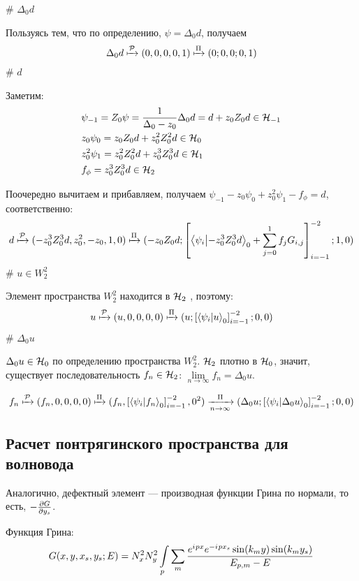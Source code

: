 \begin{elist}
# $\Delta_0 d$

Пользуясь тем, что по определению, $\psi = \Delta_0 d$, получаем
\[
\Delta_0 d \xmapsto[]{\mathcal{P}} (0, 0, 0, 0, 1) \xmapsto[]{\Pi} (0; 0, 0; 0, 1)
\]
# $d$

Заметим:
\begin{align*}
& \psi_{-1} = Z_0 \psi = \frac{1}{\Delta_0 - z_0} \Delta_0 d = d + z_0 Z_0 d \in \mathcal{H}_{-1} \\
& z_0 \psi_{0} = z_0 Z_0 d + z_0^2 Z_0^2 d \in \mathcal{H}_{0} \\
& z_0^2 \psi_{1} = z_0^2 Z_0^2 d + z_0^3 Z_0^3 d \in \mathcal{H}_{1} \\
& f_\phi = z_0^3 Z_0^3 d \in \mathcal{H}_{2}
\end{align*}

Поочередно вычитаем и прибавляем, получаем  $\psi_{-1} - z_0 \psi_0 + z_0^2 \psi_1 - f_\phi =  d$, соответственно:
\[
d \xmapsto[]{\mcP} (-z_0^3 Z_0^3 d, z_0^2, -z_0, 1, 0) \xmapsto[]{\Pi} (-z_0 Z_0 d; \left[ \ip{\psi_i}{-z_0^3 Z_0^3 d}_0 + \sum\limits_{j = 0}^1 f_j G_{i, j} \right]_{i = -1}^{-2};1, 0)
\]
# $u \in W_2^2$

Элемент пространства $W_2^2$ находится в $\mathcal{H}_{2}$ , поэтому:
\[
u \xmapsto[]{\mcP} (u, 0, 0, 0, 0) \xmapsto[]{\Pi} (u;\left[ \ip{\psi_i}{u}_0 \right]_{i = -1}^{-2}; 0, 0)
\]
# $\Delta_0 u$

$\Delta_0 u \in \mathcal{H}_{0}$ по определению пространства $W_2^2$. $\mathcal{H}_{2}$ плотно в $\mathcal{H}_{0}$, значит, существует последовательность $f_n \in \mathcal{H}_{2}$: $\lim\limits_{n \to \infty} f_n = \Delta_0 u$.

\[f_n \xmapsto[]{\mcP} (f_n, 0, 0, 0, 0) \xmapsto[]{\Pi} (f_n, \left[ \ip{\psi_i}{f_n}_0 \right]_{i = -1}^{-2}, 0^2) \xrightarrow[n \to \infty]{\Pi} (\Delta_0 u; \left[ \ip{\psi_i}{\Delta_0 u}_0 \right]_{i = -1}^{-2}; 0, 0)\]
\end{elist}


\subsection{Расчет понтрягинского пространства для волновода}
Аналогично, дефектный элемент — производная функции Грина по нормали, то есть, $-\pdv{G}{y_s}$.

Функция Грина:
\[
G(x, y, x_s, y_s; E) = N_x^2 N_y^2 \int\limits_p \sum\limits_m \frac{e^{{i\mkern1mu} p x} e^{-{i\mkern1mu} p x_s} \sin(k_m y) \sin(k_m y_s)}{E_{p, m} - E}
\]

